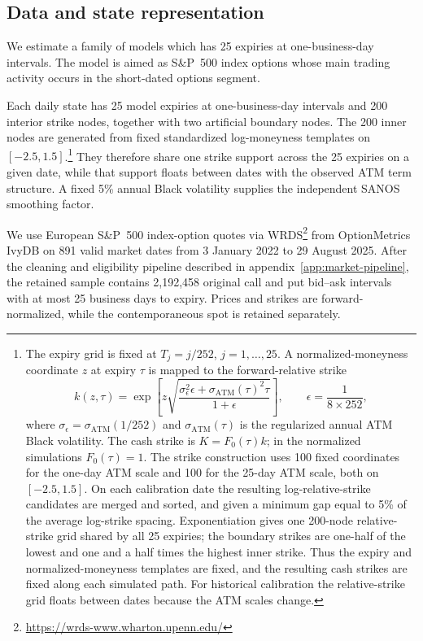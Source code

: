 \documentclass[11pt]{article}
\theoremstyle{plain}
\theoremstyle{definition}
\theoremstyle{remark}
\begin{document}
\subsection{Data and state representation}
\label{sec:estimation-data}

We estimate a family of models which has 25 expiries at one-business-day intervals. The model is aimed as S\&P~500 index options
whose main trading activity occurs in the short-dated options segment.

Each daily state has 25 model expiries at one-business-day intervals and 200
interior strike nodes, together with two artificial boundary nodes. The 200
inner nodes are generated from fixed standardized log-moneyness templates on
$[-2.5,1.5]$.\footnote{The expiry grid is fixed at $T_j=j/252$,
$j=1,\ldots,25$.  A normalized-moneyness coordinate $z$ at expiry $\tau$ is
mapped to the forward-relative strike
\[
k(z,\tau)=\exp\!\left[z\sqrt{
\frac{\sigma_{\epsilon}^2\epsilon+
\sigma_{\mathrm{ATM}}(\tau)^2\tau}{1+\epsilon}}
\right],
\qquad \epsilon=\frac{1}{8\times252},
\]
where $\sigma_{\epsilon}=\sigma_{\mathrm{ATM}}(1/252)$ and
$\sigma_{\mathrm{ATM}}(\tau)$ is the regularized annual ATM Black volatility.
The cash strike is $K=F_0(\tau)k$; in the normalized simulations $F_0(\tau)=1$.
The strike construction uses 100 fixed coordinates for the one-day ATM scale
and 100 for the 25-day ATM scale, both on $[-2.5,1.5]$.  On each calibration
date the resulting log-relative-strike candidates are merged and sorted, and
given a minimum gap equal to 5\% of the average log-strike spacing.
Exponentiation gives one 200-node relative-strike grid shared by all 25
expiries; the boundary strikes are one-half of the lowest and one and a half
times the highest inner strike.  Thus the expiry and normalized-moneyness
templates are fixed, and the resulting cash strikes are fixed along each
simulated path.  For historical calibration the relative-strike grid floats
between dates because the ATM scales change.}
They therefore share one strike support across the 25 expiries on a given
date, while that support floats between dates with the observed ATM term
structure. A fixed 5\% annual Black volatility supplies the independent SANOS
smoothing factor.

We use European S\&P~500 index-option quotes via WRDS\footnote{\url{https://wrds-www.wharton.upenn.edu/}} from OptionMetrics IvyDB
on 891 valid market dates from 3 January 2022 to 29 August 2025.
After the cleaning and eligibility pipeline described in
appendix~\ref{app:market-pipeline}, the retained sample contains 2,192,458
original call and put bid--ask intervals with at most 25 business days to
expiry. Prices and strikes are forward-normalized, while the contemporaneous
spot is retained separately.
\end{document}
